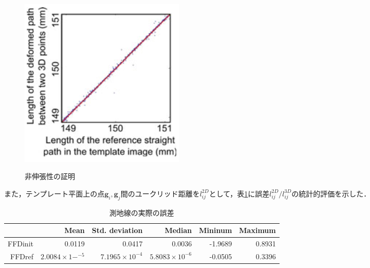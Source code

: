 \documentclass[10.5pt,twocolumn,a4j,fleqn]{ujarticle}
\def\tblref#1{表\ref{#1}}
\begin{document}
\begin{figure}[htbp]
\begin{minipage}[t]{\hsize}
    \label{fig4b}
  \end{minipage}
    \\
  \begin{minipage}[t]{\hsize}
    \centering
    \includegraphics[width=0.7\linewidth]{img/fig4c.png}
    \label{fig4c}
  \end{minipage}
 \caption{非伸張性の証明}
\end{figure}
また，テンプレート平面上の点$\bm{g}_i,\bm{g}_j$間のユークリッド距離を$l_{ij}^{2D}$として，\tblref{table2}に誤差$l_{ij}^{2D}/l_{ij}^{3D}$の統計的評価を示した．
\begin{table}[htb]
  \caption{測地線の実際の誤差}
  \centering
  \begin{tabular}{|r|r|r|r|r|r|} \hline
      & Mean & Std. deviation & Median & Mininum & Maximum \\ \hline
      FFDinit& 0.0119 & 0.0417 & 0.0036 & -1.9689 & 0.8931 \\ \hline
      FFDref& $2.0084\times1-^{-5}$ & $7.1965\times10^{-4}$ & $5.8083\times10^{-6}$ & -0.0505 & 0.3396 \\ \hline
  \end{tabular}
  \label{table2}
\end{table}
\end{document}
